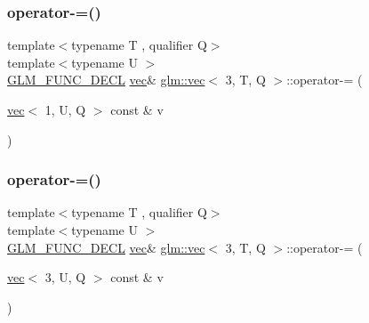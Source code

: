 \mbox{\label{structglm_1_1vec_3_013_00_01_t_00_01_q_01_4_a9b8dba9adb57ad50b1f22fdf3864407e}} 
\subsubsection{\texorpdfstring{operator-\/=()}{operator-=()}\hspace{0.1cm}{\footnotesize\ttfamily [2/6]}}
{\footnotesize\ttfamily template$<$typename T , qualifier Q$>$ \\
template$<$typename U $>$ \\
\hyperlink{setup_8hpp_ab2d052de21a70539923e9bcbf6e83a51}{G\+L\+M\+\_\+\+F\+U\+N\+C\+\_\+\+D\+E\+CL} \hyperlink{structglm_1_1vec}{vec}\& \hyperlink{structglm_1_1vec}{glm\+::vec}$<$ 3, T, Q $>$\+::operator-\/= (\begin{DoxyParamCaption}\item[{\hyperlink{structglm_1_1vec}{vec}$<$ 1, U, Q $>$ const \&}]{v }\end{DoxyParamCaption})}

\mbox{\label{structglm_1_1vec_3_013_00_01_t_00_01_q_01_4_af172872e811a8262f44dc83a9784354e}} 
\subsubsection{\texorpdfstring{operator-\/=()}{operator-=()}\hspace{0.1cm}{\footnotesize\ttfamily [3/6]}}
{\footnotesize\ttfamily template$<$typename T , qualifier Q$>$ \\
template$<$typename U $>$ \\
\hyperlink{setup_8hpp_ab2d052de21a70539923e9bcbf6e83a51}{G\+L\+M\+\_\+\+F\+U\+N\+C\+\_\+\+D\+E\+CL} \hyperlink{structglm_1_1vec}{vec}\& \hyperlink{structglm_1_1vec}{glm\+::vec}$<$ 3, T, Q $>$\+::operator-\/= (\begin{DoxyParamCaption}\item[{\hyperlink{structglm_1_1vec}{vec}$<$ 3, U, Q $>$ const \&}]{v }\end{DoxyParamCaption})}

